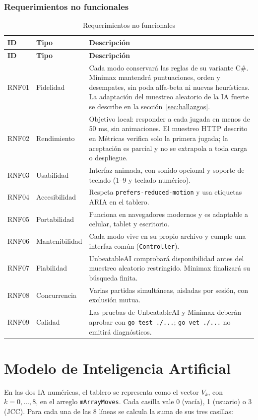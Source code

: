 \documentclass[12pt,a4paper]{article}
\begin{document}
\subsubsection{Requerimientos no funcionales}
\begin{longtable}{p{1.3cm}p{2.9cm}p{9.2cm}}
\caption{Requerimientos no funcionales}\\
\toprule
\textbf{ID} & \textbf{Tipo} & \textbf{Descripción}\\
\midrule\endfirsthead
\toprule
\textbf{ID} & \textbf{Tipo} & \textbf{Descripción}\\
\midrule\endhead
RNF01 & Fidelidad & Cada modo conservará las reglas de su variante C\#. Minimax mantendrá puntuaciones, orden y desempates, sin poda alfa-beta ni nuevas heurísticas. La adaptación del muestreo aleatorio de la IA fuerte se describe en la sección~\ref{sec:hallazgos}.\\
RNF02 & Rendimiento & Objetivo local: responder a cada jugada en menos de 50 ms, sin animaciones. El muestreo HTTP descrito en Métricas verifica solo la primera jugada; la aceptación es parcial y no se extrapola a toda carga o despliegue.\\
RNF03 & Usabilidad & Interfaz animada, con sonido opcional y soporte de teclado (1--9 y teclado numérico).\\
RNF04 & Accesibilidad & Respeta \texttt{prefers-reduced-motion} y usa etiquetas ARIA en el tablero.\\
RNF05 & Portabilidad & Funciona en navegadores modernos y es adaptable a celular, tablet y escritorio.\\
RNF06 & Mantenibilidad & Cada modo vive en su propio archivo y cumple una interfaz común (\texttt{Controller}).\\
RNF07 & Fiabilidad & UnbeatableAI comprobará disponibilidad antes del muestreo aleatorio restringido. Minimax finalizará su búsqueda finita.\\
RNF08 & Concurrencia & Varias partidas simultáneas, aisladas por sesión, con exclusión mutua.\\
RNF09 & Calidad & Las pruebas de UnbeatableAI y Minimax deberán aprobar con \texttt{go test ./...}; \texttt{go vet ./...} no emitirá diagnósticos.\\
\bottomrule
\end{longtable}

\section{Modelo de Inteligencia Artificial}
En las dos IA numéricas, el tablero se representa como el vector $V_k$, con $k = 0,\dots,8$, en el
arreglo \texttt{mArrayMoves}. Cada casilla vale 0 (vacía), 1 (usuario) o
3 (JCC). Para cada una de las 8 líneas se calcula la suma de sus tres
casillas:
\end{document}

